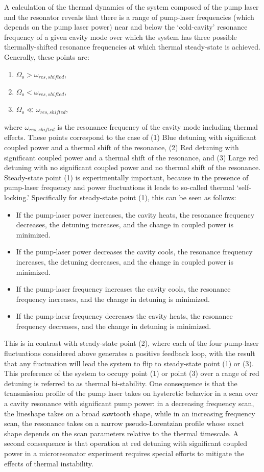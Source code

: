 A calculation of the thermal dynamics of the system composed of the pump laser and the resonator reveals that there is a range of pump-laser frequencies (which depends on the pump laser power) near and below the `cold-cavity' resonance frequency of a given cavity mode over which the system has three possible thermally-shifted resonance frequencies at which thermal steady-state is achieved. Generally, these points are:
\begin{enumerate}
\item $\Omega_o>\omega_{res,shifted}$,
\item $\Omega_o<\omega_{res,shifted}$,
\item $\Omega_o\ll\omega_{res,shifted}$,
\end{enumerate}
where $\omega_{res,shifted}$ is the resonance frequency of the cavity mode including thermal effects. These points correspond to the case of (1) Blue detuning with significant coupled power and a thermal shift of the resonance, (2) Red detuning with significant coupled power and a thermal shift of the resonance, and (3) Large red detuning with no significant coupled power and no thermal shift of the resonance. Steady-state point (1) is experimentally important, because in the presence of pump-laser frequency and power fluctuations it leads to so-called thermal `self-locking.' Specifically for steady-state point (1), this can be seen as follows: 
\begin{itemize}
	\item If the pump-laser power increases, the cavity heats, the resonance frequency decreases, the detuning increases, and the change in coupled power is minimized.
	\item If the pump-laser power decreases the cavity cools, the resonance frequency increases, the detuning decreases, and the change in coupled power is minimized.
	\item If the pump-laser frequency increases the cavity cools, the resonance frequency increases, and the change in detuning is minimized.
	\item If the pump-laesr frequency decreases the cavity heats, the resonance frequency decreases, and the change in detuning is minimized.
	\end{itemize}
This is in contrast with steady-state point (2), where each of the four pump-laser fluctuations considered above generates a positive feedback loop, with the result that any fluctuation will lead the system to flip to steady-state point (1) or (3). This preference of the system to occupy point (1) or point (3) over a range of red detuning is referred to as thermal bi-stability. One consequence is that the transmission profile of the pump laser takes on hysteretic behavior in a scan over a cavity resonance with significant pump power: in a decreasing frequency scan, the lineshape takes on a broad sawtooth shape, while in an increasing frequency scan, the resonance takes on a narrow pseudo-Lorentzian profile whose exact shape depends on the scan parameters relative to the thermal timescale. A second consequence is that operation at red detuning with significant coupled power in a microresonator experiment requires special efforts to mitigate the effects of thermal instability.

